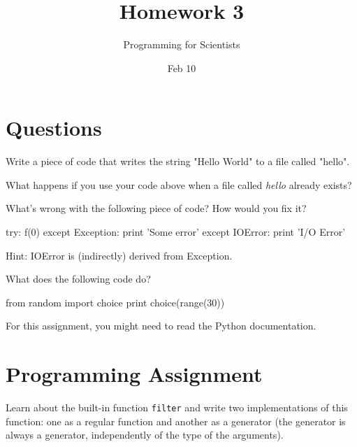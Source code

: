 
\author{Programming for Scientists}
\title{Homework 3}
\date{Feb 10}

\maketitle

\chapter{Questions}

\question
Write a piece of code that writes the string "Hello World" to a file called "hello".

\question
What happens if you use your code above when a file called \textit{hello} already exists?

\question
What's wrong with the following piece of code? How would you fix it?

\begin{python}
try:
    f(0)
except Exception:
    print 'Some error'
except IOError:
    print 'I/O Error'
\end{python}

Hint: IOError is (indirectly) derived from Exception.

\question
What does the following code do?

\begin{python}
from random import choice
print choice(range(30))
\end{python}

For this assignment, you might need to read the Python documentation.

\chapter{Programming Assignment}

Learn about the built-in function \lstinline{filter} and write two implementations of this function: one as a regular function and another as a generator (the generator is always a generator, independently of the type of the arguments).


